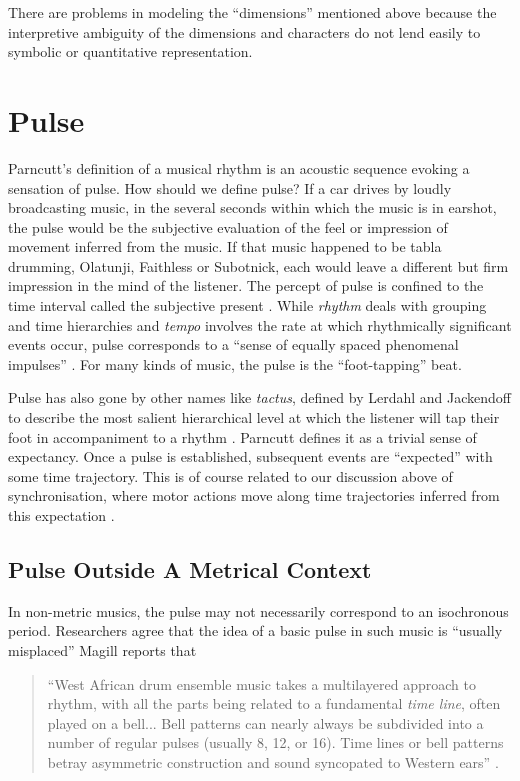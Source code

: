 There are problems in modeling the ``dimensions'' mentioned above
because the interpretive ambiguity of the dimensions and characters 
do not lend easily to symbolic or quantitative representation. 


\vspace{7mm}
\section{Pulse}
\vspace{3mm}

Parncutt's definition of a musical rhythm is an acoustic
sequence evoking a sensation of pulse.  How should we define pulse?  
If a car drives by loudly broadcasting music, in the several seconds within
which the music is in earshot, the pulse would be the subjective
evaluation of the feel or impression of movement inferred from the
music. If that music happened to be tabla drumming, Olatunji, Faithless or
Subotnick, each would leave a different but firm impression in the mind
of the listener.  
The percept of pulse is confined to the time interval called the
subjective present \cite[p. 451]{Parncutt:94}. While {\it rhythm}
deals with grouping and time hierarchies and {\it tempo} involves the 
rate at which rhythmically significant events occur, pulse corresponds
to a ``sense of equally spaced phenomenal impulses''
\cite{Scheirer:98tempo}. For many kinds of music, the pulse is the
``foot-tapping'' beat.

Pulse has also gone by other names like {\it tactus}, defined by Lerdahl and
Jackendoff to describe the most salient hierarchical level at which
the listener will tap their foot in accompaniment to a rhythm \cite[p. 31]{Smith:99}.
Parncutt defines it as a trivial sense of expectancy. Once a pulse is
established, subsequent events are ``expected'' with some time
trajectory. This is of course related to our discussion above of
synchronisation, where motor actions move along time trajectories
inferred from this expectation \cite[p. 453]{Parncutt:94}.

\vspace{5mm}
\subsection{Pulse Outside A Metrical Context}

In non-metric musics, the pulse may not necessarily correspond to an
isochronous period.  Researchers agree that the idea of a basic pulse
in such music is ``usually misplaced'' \cite[p. 190]{Magill:97}
Magill reports that 
\begin{quote}
``West African drum ensemble music takes a multilayered approach to
rhythm, with all the parts being related to a fundamental {\it time
line}, often played on a bell... Bell patterns can nearly always be
subdivided into a number of regular pulses (usually 8, 12, or
16). Time lines or bell patterns betray asymmetric construction
and sound syncopated to Western ears'' \cite[p. 190]{Magill:97}.
\end{quote}

